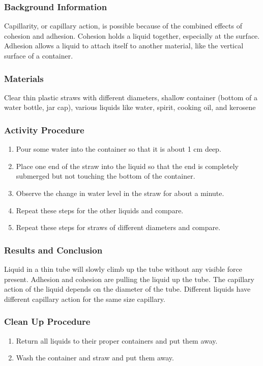 \subsubsection*{Background Information}
Capillarity, or capillary action, is possible because of the combined effects of cohesion and adhesion. Cohesion holds a liquid together, especially at the surface. Adhesion allows a liquid to attach itself to another material, like the vertical surface of a container. 

\subsubsection*{Materials}
Clear thin plastic straws with different diameters, shallow container (bottom of a water bottle, jar cap), various liquids like water, spirit, cooking oil, and kerosene 

\subsubsection*{Activity Procedure}
\begin{enumerate}
\item{Pour some water into the container so that it is about 1 cm deep.} 
\item{Place one end of the straw into the liquid so that the end is completely submerged but not touching the bottom of the container.} 
\item{Observe the change in water level in the straw for about a minute.} 
\item{Repeat these steps for the other liquids and compare.}
\item{Repeat these steps for straws of different diameters and compare.} 
\end{enumerate}

\subsubsection*{Results and Conclusion}
Liquid in a thin tube will slowly climb up the tube without any visible force present. Adhesion and cohesion are pulling the liquid up the tube. The capillary action of the liquid depends on the diameter of the tube. Different liquids have different capillary action for the same size capillary.

\subsubsection*{Clean Up Procedure}
\begin{enumerate}
\item{Return all liquids to their proper containers and put them away.} 
\item{Wash the container and straw and put them away.} 
\end{enumerate}

